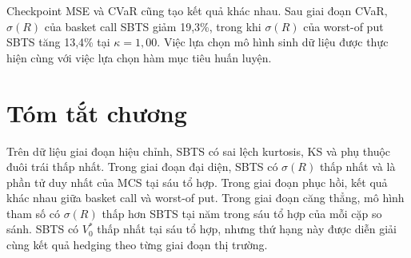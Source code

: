Checkpoint MSE và CVaR cũng tạo kết quả khác nhau. Sau giai đoạn CVaR,
$\sigma(R)$ của basket call SBTS giảm 19,3\%, trong khi $\sigma(R)$ của
worst-of put SBTS tăng 13,4\% tại $\kappa=1{,}00$. Việc lựa chọn mô hình sinh
dữ liệu được thực hiện cùng với việc lựa chọn hàm mục tiêu huấn luyện.

\section{Tóm tắt chương}

Trên dữ liệu giai đoạn hiệu chỉnh, SBTS có sai lệch kurtosis, KS và phụ thuộc
đuôi trái thấp nhất. Trong giai đoạn đại diện,
SBTS có $\sigma(R)$ thấp nhất và là phần tử duy nhất của MCS tại sáu tổ hợp.
Trong giai đoạn phục hồi, kết quả khác nhau giữa basket call và worst-of put. Trong
giai đoạn căng thẳng, mô hình tham số có $\sigma(R)$ thấp hơn SBTS tại năm trong sáu tổ hợp
của mỗi cặp so sánh. SBTS có $V_0^{*}$ thấp nhất tại sáu tổ hợp, nhưng thứ hạng
này được diễn giải cùng kết quả hedging theo từng giai đoạn thị trường.
